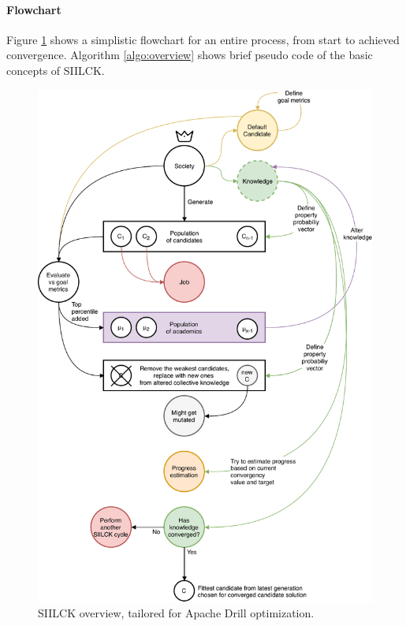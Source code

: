 \documentclass[a4paper,english]{report}
\begin{document}
			\paragraph{Flowchart}
			Figure \ref{fig:sys_overview} shows a simplistic flowchart for an entire process, from start to achieved convergence. Algorithm \ref{algo:overview} shows brief pseudo code of the basic concepts of SIILCK.
			\begin{figure}[H]
				\centering
				\includegraphics[width=330pt]{overview}
				\caption{SIILCK overview, tailored for Apache Drill optimization.}
				\label{fig:sys_overview}
			\end{figure}
			\clearpage
\end{document}
